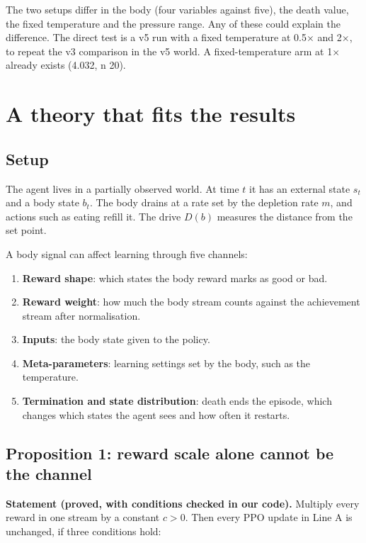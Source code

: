 \documentclass[11pt]{article}
\begin{document}
The two setups differ in the body (four variables against five), the death value, the fixed temperature and the pressure range. Any of these could explain the difference. The direct test is a v5 run with a fixed temperature at 0.5$\times$ and 2$\times$, to repeat the v3 comparison in the v5 world. A fixed-temperature arm at 1$\times$ already exists (4.032, n 20).

\section{A theory that fits the results}

\subsection{Setup}

The agent lives in a partially observed world. At time $t$ it has an external state $s_t$ and a body state $b_t$. The body drains at a rate set by the depletion rate $m$, and actions such as eating refill it. The drive $D(b)$ measures the distance from the set point.

A body signal can affect learning through five channels:

\begin{enumerate}
\item \textbf{Reward shape}: which states the body reward marks as good or bad.
\item \textbf{Reward weight}: how much the body stream counts against the achievement stream after normalisation.
\item \textbf{Inputs}: the body state given to the policy.
\item \textbf{Meta-parameters}: learning settings set by the body, such as the temperature.
\item \textbf{Termination and state distribution}: death ends the episode, which changes which states the agent sees and how often it restarts.
\end{enumerate}

\subsection{Proposition 1: reward scale alone cannot be the channel}

\textbf{Statement (proved, with conditions checked in our code).} Multiply every reward in one stream by a constant $c > 0$. Then every PPO update in Line A is unchanged, if three conditions hold:
\end{document}
